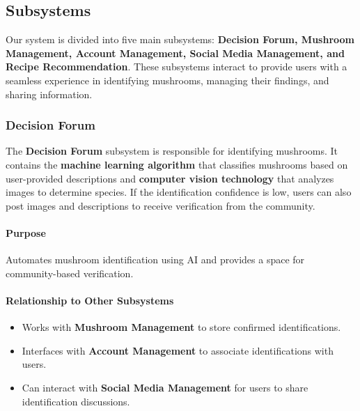 \documentclass[]{article}
\begin{document}

\subsection{Subsystems}
Our system is divided into five main subsystems: \textbf{Decision Forum, Mushroom Management, Account Management, Social Media Management, and Recipe Recommendation}. These subsystems interact to provide users with a seamless experience in identifying mushrooms, managing their findings, and sharing information.

\subsubsection{Decision Forum}
The \textbf{Decision Forum} subsystem is responsible for identifying mushrooms. It contains the \textbf{machine learning algorithm} that classifies mushrooms based on user-provided descriptions and \textbf{computer vision technology} that analyzes images to determine species. If the identification confidence is low, users can also post images and descriptions to receive verification from the community.
 
\paragraph{Purpose}
Automates mushroom identification using AI and provides a space for community-based verification.
 
\paragraph{Relationship to Other Subsystems}
\begin{itemize}
    \item Works with \textbf{Mushroom Management} to store confirmed identifications.
    \item Interfaces with \textbf{Account Management} to associate identifications with users.
    \item Can interact with \textbf{Social Media Management} for users to share identification discussions.
\end{itemize}
 
\end{document}
